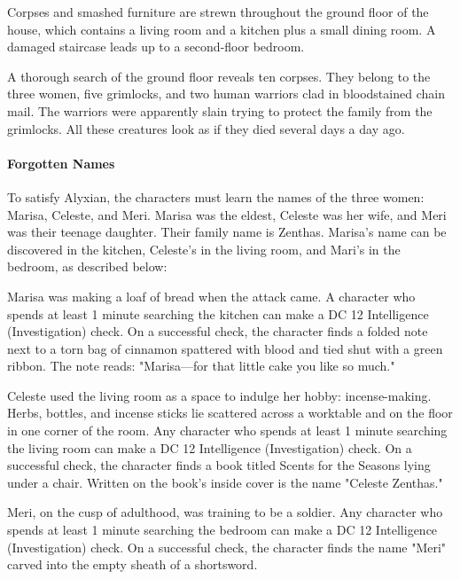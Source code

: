\documentclass[10pt,a4paper,twoside,twocolumn,openany,nodeprecatedcode]{dndbook}
\begin{document}
\begin{DndReadAloud}{}
Corpses and smashed furniture are strewn throughout the ground floor of the house, which contains a living room and a kitchen plus a small dining room. A damaged staircase leads up to a second-floor bedroom.

\end{DndReadAloud}

A thorough search of the ground floor reveals ten corpses. They belong to the three women, five grimlocks, and two human warriors clad in bloodstained chain mail. The warriors were apparently slain trying to protect the family from the grimlocks. All these creatures look as if they died several days a day ago.

\paragraph{Forgotten Names}
To satisfy Alyxian, the characters must learn the names of the three women: Marisa, Celeste, and Meri. Marisa was the eldest, Celeste was her wife, and Meri was their teenage daughter. Their family name is Zenthas. Marisa's name can be discovered in the kitchen, Celeste's in the living room, and Mari's in the bedroom, as described below:


\begin{description}[nolistsep]
\item[Kitchen.]
Marisa was making a loaf of bread when the attack came. A character who spends at least 1 minute searching the kitchen can make a DC 12 Intelligence (Investigation) check. On a successful check, the character finds a folded note next to a torn bag of cinnamon spattered with blood and tied shut with a green ribbon. The note reads: "Marisa—for that little cake you like so much."

\item[Living Room.]
Celeste used the living room as a space to indulge her hobby: incense-making. Herbs, bottles, and incense sticks lie scattered across a worktable and on the floor in one corner of the room. Any character who spends at least 1 minute searching the living room can make a DC 12 Intelligence (Investigation) check. On a successful check, the character finds a book titled Scents for the Seasons lying under a chair. Written on the book's inside cover is the name "Celeste Zenthas."

\item[Bedroom.]
Meri, on the cusp of adulthood, was training to be a soldier. Any character who spends at least 1 minute searching the bedroom can make a DC 12 Intelligence (Investigation) check. On a successful check, the character finds the name "Meri" carved into the empty sheath of a shortsword.
\end{description}
\end{document}
